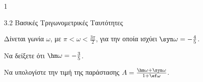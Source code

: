 \begin{ylh}{1}
\item 3.2 Βασικές Τριγωνομετρικές Ταυτότητες
\end{ylh}
Δίνεται γωνία $\omega$, με $\pi < \omega < \frac{3\pi}{2}$, για την οποία ισχύει $\syn \omega = -\frac{4}{5}$.
\begin{alist}
\item Να δείξετε ότι $\hm \omega = -\frac{3}{5}$.
\item Να υπολογίστε την τιμή της παράστασης $A = \frac{\hm \omega + \syn \omega}{1 + \ef \omega}$.
\end{alist}

